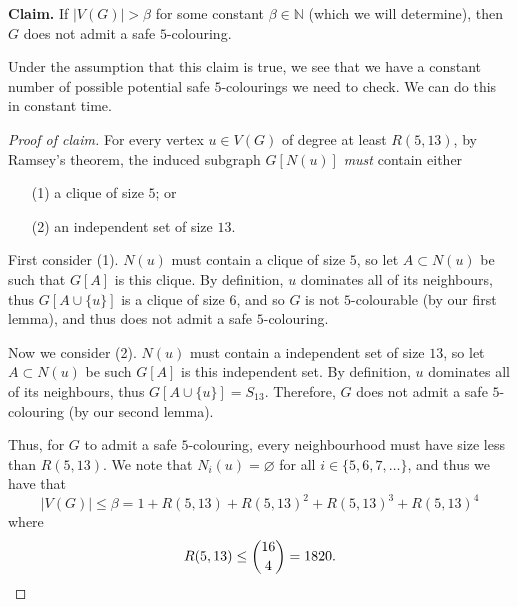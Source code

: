 \begin{solution}
    \textbf{Claim.} If $\lvert V(G) \rvert > \beta$ for some constant $\beta \in \mathbb N$ (which we will determine), then $G$ does not admit a safe $5$-colouring.

    Under the assumption that this claim is true, we see that we have a constant number of possible potential safe $5$-colourings we need to check. We can do this in constant time. 

    \begin{proof}[Proof of claim]
        For every vertex $u \in V(G)$ of degree at least $R(5, 13)$, by Ramsey's theorem, the induced subgraph $G[N(u)]$ \emph{must} contain either
        \begin{enumerate}
            \item[(1)] a clique of size $5$; or
            \item[(2)] an independent set of size $13$. 
        \end{enumerate}
        First consider (1). $N(u)$ must contain a clique of size $5$, so let $A \subset N(u)$ be such that $G[A]$ is this clique. By definition, $u$ dominates all of its neighbours, thus $G[A \cup \{u\}]$ is a clique of size $6$, and so $G$ is not $5$-colourable (by our first lemma), and thus does not admit a safe $5$-colouring. 
        
        Now we consider (2). $N(u)$ must contain a independent set of size $13$, so let $A \subset N(u)$ be such $G[A]$ is this independent set. By definition, $u$ dominates all of its neighbours, thus $G[A \cup \{u\}] = S_{13}$. Therefore, $G$ does not admit a safe $5$-colouring (by our second lemma).

        Thus, for $G$ to admit a safe $5$-colouring, every neighbourhood must have size less than $R(5, 13)$. We note that $N_i(u) = \varnothing$ for all $i \in \{5,6,7,\ldots\}$, and thus we have that
        \[ 
            \lvert V(G) \rvert \leq \beta = 1 + R(5,13) + R(5,13)^2 + R(5,13)^3 + R(5,13)^4
         \]
         where
         \[
            R(5, 13) \leq \binom{16}{4} = 1820. \qedhere
         \]
    \end{proof}
\end{solution}